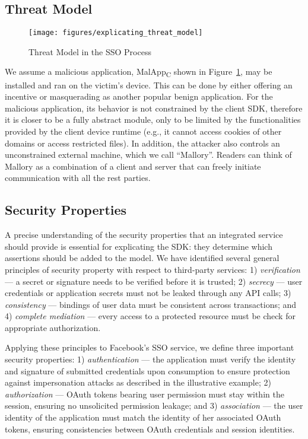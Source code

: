 \subsection{Threat Model}

\begin{figure}[hbt]
\centering
\texttt{[image: figures/explicating\_threat\_model]}
\caption{Threat Model in the SSO Process}
\label{fig:explicating_threat_model}
\end{figure}

We assume a malicious application, MalApp\textsubscript{C} shown in Figure~\ref{fig:explicating_threat_model}, may be installed and ran on the victim's device.  This can be done by either offering an incentive or masquerading as another popular benign application.  For the malicious application, its behavior is not constrained by the client SDK, therefore it is closer to be a fully abstract module, only to be limited by the functionalities provided by the client device runtime (e.g., it cannot access cookies of other domains or access restricted files).  In addition, the attacker also controls an unconstrained external machine, which we call ``Mallory''. Readers can think of Mallory as a combination of a client and server that can freely initiate communication with all the rest parties. 

\subsection{Security Properties}
\label{sec:security_properties}
A precise understanding of the security properties that an integrated service should provide is essential for explicating the SDK: they determine which assertions should be added to the model.  We have identified several general principles of security property with respect to third-party services: 1) \emph{verification} --- a secret or signature needs to be verified before it is trusted; 2) \emph{secrecy} --- user credentials or application secrets must not be leaked through any API calls; 3) \emph{consistency} --- bindings of user data must be consistent across transactions; and 4) \emph{complete mediation} --- every access to a protected resource must be check for appropriate authorization.  

Applying these principles to Facebook's SSO service, we define three important security properties: 1) \emph{authentication}
--- the application must verify the identity and signature of submitted credentials upon consumption to ensure protection against impersonation attacks as described in the illustrative example; 2) \emph{authorization} --- OAuth tokens bearing user
permission must stay within the session, ensuring no unsolicited permission leakage; and 3) \emph{association} --- the user identity of the application must match the identity of her associated OAuth tokens, ensuring consistencies between OAuth credentials and session identities.

